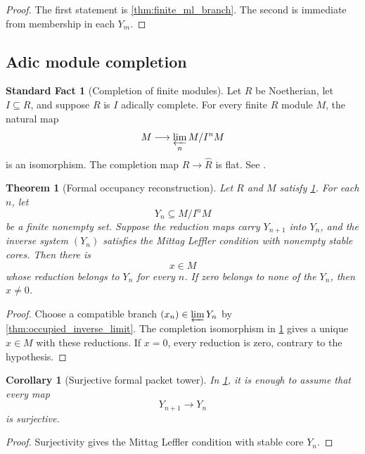 \documentclass{aomart}
\newtheorem{theorem}{Theorem}[section]
\newtheorem{corollary}[corollary]{Corollary}
\theoremstyle{definition}
\newtheorem{standardfact}[standardfact]{Standard Fact}
\theoremstyle{remark}
\begin{document}
\begin{proof}
The first statement is \cref{thm:finite_ml_branch}. The second is immediate from membership in each \(Y_m\).
\end{proof}

\subsection{Adic module completion}

\begin{standardfact}[Completion of finite modules]\label{fact:module_completion}
Let \(R\) be Noetherian, let \(I\subseteq R\), and suppose \(R\) is \(I\) adically complete. For every finite \(R\) module \(M\), the natural map
\[
M
\longrightarrow
\varprojlim_nM/I^nM
\]
is an isomorphism. The completion map \(R\to\widehat R\) is flat. See \cite{AtiyahMacdonald1969,Bourbaki1989,Matsumura1989}.
\end{standardfact}

\begin{theorem}[Formal occupancy reconstruction]\label{thm:formal_occupancy}
Let \(R\) and \(M\) satisfy \cref{fact:module_completion}. For each \(n\), let
\[
Y_n\subseteq M/I^nM
\]
be a finite nonempty set. Suppose the reduction maps carry \(Y_{n+1}\) into \(Y_n\), and the inverse system \((Y_n)\) satisfies the Mittag Leffler condition with nonempty stable cores. Then there is
\[
x\in M
\]
whose reduction belongs to \(Y_n\) for every \(n\). If zero belongs to none of the \(Y_n\), then \(x\neq0\).
\end{theorem}

\begin{proof}
Choose a compatible branch \((x_n)\in\varprojlim Y_n\) by \cref{thm:occupied_inverse_limit}. The completion isomorphism in \cref{fact:module_completion} gives a unique \(x\in M\) with these reductions. If \(x=0\), every reduction is zero, contrary to the hypothesis.
\end{proof}

\begin{corollary}[Surjective formal packet tower]\label{cor:surjective_formal_packet}
In \cref{thm:formal_occupancy}, it is enough to assume that every map
\[
Y_{n+1}\longrightarrow Y_n
\]
is surjective.
\end{corollary}

\begin{proof}
Surjectivity gives the Mittag Leffler condition with stable core \(Y_n\).
\end{proof}
\end{document}
